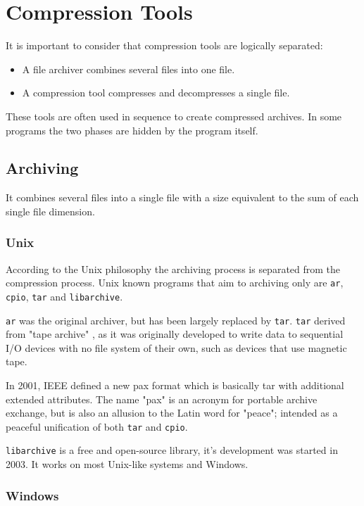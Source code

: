 \documentclass[12pt, a4paper]{report}
\begin{document}
\chapter{Compression Tools}

It is important to consider that compression tools are logically separated:

\begin{itemize}
  \item A file archiver combines several files into one file.
  \item A compression tool compresses and decompresses a single file.
\end{itemize}

These tools are often used in sequence to create compressed archives.
In some programs the two phases are hidden by the program itself.

\section{Archiving}

It combines several files into a single file with a size equivalent to the sum of each single file dimension.

\subsection{Unix}

According to the Unix philosophy the archiving process is separated from the compression process.
Unix known programs that aim to archiving only are \texttt{ar}, \texttt{cpio}, \texttt{tar} and \texttt{libarchive}.

\texttt{ar} was the original archiver, but has been largely replaced by \texttt{tar}.
\texttt{tar} derived from "tape archive" , as it was originally developed to write data to sequential I/O devices with no file
system of their own, such as devices that use magnetic tape.

In 2001, IEEE defined a new pax format which is basically tar with additional extended attributes.
The name "pax" is an acronym for portable archive exchange, but is also an allusion to the Latin word for "peace"; intended as a
peaceful unification of both \texttt{tar} and \texttt{cpio}.

\texttt{libarchive} is a free and open-source library, it's development was started in 2003.
It works on most Unix-like systems and Windows.

\subsection{Windows}
\end{document}
